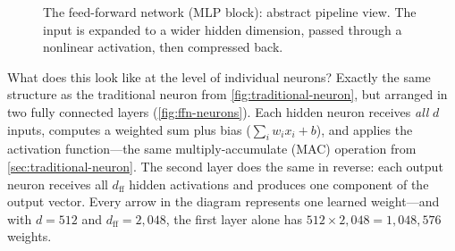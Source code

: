 \begin{figure}[htbp]
\centering
{}
\caption{The feed-forward network (MLP block): abstract pipeline view.
  The input is expanded to a wider hidden dimension, passed
  through a nonlinear activation, then compressed back.}
\label{fig:ffn}
\end{figure}

What does this look like at the level of individual neurons?
Exactly the same structure as the traditional neuron from
\cref{fig:traditional-neuron}, but arranged in two fully connected
layers (\cref{fig:ffn-neurons}). Each hidden neuron receives
\emph{all} $d$ inputs, computes a weighted sum plus bias
($\sum_i w_i x_i + b$), and applies the activation function---the
same multiply-accumulate (MAC) operation from
\cref{sec:traditional-neuron}.
The second layer does the same in reverse: each output neuron
receives all $d_{\text{ff}}$ hidden activations and produces one
component of the output vector. Every arrow in the diagram
represents one learned weight---and with $d = 512$ and
$d_{\text{ff}} = 2{,}048$, the first layer alone has
$512 \times 2{,}048 = 1{,}048{,}576$ weights.

